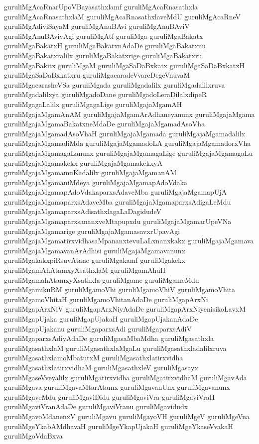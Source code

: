 {guruliMgAcaRnarUpoVBayasathxlamf
guruliMgAcaRnasathxla
guruliMgAcaRnasathxlaM
guruliMgAcaRnasathxlaveMdU
guruliMgAcaRneV
guruliMgAdiviSayaM
guruliMgAnuBAvi
guruliMgAnuBAviV
guruliMgAnuBAviyAgi
guruliMgAtf
guruliMga
guruliMgaBakatx
guruliMgaBakatxH
guruliMgaBakatxnAdaDe
guruliMgaBakatxnu
guruliMgaBakatxralilx
guruliMgaBakatxrige
guruliMgaBakatxru
guruliMgaBakitx
guruliMgaM
guruliMgaSaDaBxkatx
guruliMgaSaDaBxkatxH
guruliMgaSaDaBxkatxru
guruliMgacaradeVvareDegeVnuvaM
guruliMgacarasheVSa
guruliMgada
guruliMgadalilx
guruliMgadalilxruva
guruliMgadalilxya
guruliMgadoDane
guruliMgadoLeraDilalxdipeR
guruliMgagaLalilx
guruliMgagaLige
guruliMgajaMgamAH
guruliMgajaMgamAnAM
guruliMgajaMgamArAdhaneyanunx
guruliMgajaMgama
guruliMgajaMgamaBakatxneMdaDe
guruliMgajaMgamadAsoVha
guruliMgajaMgamadAsoVhaH
guruliMgajaMgamada
guruliMgajaMgamadalilx
guruliMgajaMgamadiMda
guruliMgajaMgamadoLA
guruliMgajaMgamadorxVha
guruliMgajaMgamagaLanunx
guruliMgajaMgamagaLige
guruliMgajaMgamagaLu
guruliMgajaMgamakekx
guruliMgajaMgamakekxyA
guruliMgajaMgamamuKadalilx
guruliMgajaMgamanAM
guruliMgajaMgamaniMdeya
guruliMgajaMgamapAdoVdaka
guruliMgajaMgamapAdoVdakaparxsAdaveMba
guruliMgajaMgamapUjA
guruliMgajaMgamaparxsAdaveMba
guruliMgajaMgamaparxsAdigaLeMdu
guruliMgajaMgamaparxsAdisathxlagaLaDagidudeV
guruliMgajaMgamaparxsananxveMtapupxdu
guruliMgajaMgamarUpeVNa
guruliMgajaMgamarige
guruliMgajaMgamasavxrUpavAgi
guruliMgajaMgamatirxvidhasaMpananxtevuLaLxnanxkakx
guruliMgajaMgamava
guruliMgajaMgamavanArAdhisi
guruliMgajaMgamavanunx
guruliMgakakxpiRsuvAtane
guruliMgakamf
guruliMgakekx
guruliMgamAhAtamxyXsathxlaM
guruliMgamAhuH
guruliMgamahAtamxyXsathxla
guruliMgame
guruliMgameMdu
guruliMgamikuRM
guruliMgamoVhi
guruliMgamoVhiV
guruliMgamoVhita
guruliMgamoVhitaH
guruliMgamoVhitanAdaDe
guruliMgapArxNi
guruliMgapArxNiV
guruliMgapArxNiyAdaDe
guruliMgapArxNiyenisikoLavxM
guruliMgapUjaka
guruliMgapUjakaH
guruliMgapUjakanAdaDe
guruliMgapUjakanu
guruliMgaparxsAdi
guruliMgaparxsAdiV
guruliMgaparxsAdiyAdaDe
guruliMgasaMbaMdha
guruliMgasathxla
guruliMgasathxlaM
guruliMgasathxlaMgaLu
guruliMgasathxladalilxruva
guruliMgasathxlamoMbatutxM
guruliMgasathxlatirxvidha
guruliMgasathxlatirxvidhaM
guruliMgasathxleV
guruliMgasayx
guruliMgaseVveyalilx
guruliMgatirxvidha
guruliMgatirxvidhaM
guruliMgavAda
guruliMgava
guruliMgavaMtarAtamx
guruliMgavanUnx
guruliMgavanunx
guruliMgaveMdu
guruliMgaviDidu
guruliMgaviVra
guruliMgaviVraH
guruliMgaviVranAdaDe
guruliMgaviVranu
guruliMgavidudx
guruliMgavoMdanenxV
guruliMgavu
guruliMgayoVH
guruliMgeV
guruliMgeVna
guruliMgeYkabAMdhavaH
guruliMgeYkapUjakaH
guruliMgeYkaseVvakaH
guruliMgoVdaBxva
}
